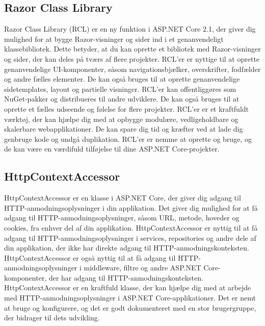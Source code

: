 \subsection{Razor Class Library}
Razor Class Library (RCL) er en ny funktion i ASP.NET Core 2.1, der giver dig mulighed for at bygge Razor-visninger og sider ind i et genanvendeligt klassebibliotek. Dette betyder, at du kan oprette et bibliotek med Razor-visninger og sider, der kan deles på tværs af flere projekter.
RCL'er er nyttige til at oprette genanvendelige UI-komponenter, såsom navigationsbjælker, overskrifter, fodfælder og andre fælles elementer.
De kan også bruges til at oprette genanvendelige sidetemplates, layout og partielle visninger. RCL'er kan offentliggøres som NuGet-pakker og distribueres til andre udviklere.
De kan også bruges til at oprette et fælles udseende og følelse for flere projekter. RCL'er er et kraftfuldt værktøj, der kan hjælpe dig med at opbygge modulære, vedligeholdbare og skalerbare webapplikationer.
De kan spare dig tid og kræfter ved at lade dig genbruge kode og undgå duplikation. RCL'er er nemme at oprette og bruge, og de kan være en værdifuld tilføjelse til dine ASP.NET Core-projekter.

\subsection{HttpContextAccessor}
HttpContextAccessor er en klasse i ASP.NET Core, der giver dig adgang til HTTP-anmodningsoplysninger i din applikation. Det giver dig mulighed for at få adgang til HTTP-anmodningsoplysninger, såsom URL, metode, hoveder og cookies, fra enhver del af din applikation.
HttpContextAccessor er nyttig til at få adgang til HTTP-anmodningsoplysninger i services, repositories og andre dele af din applikation, der ikke har direkte adgang til HTTP-anmodningskonteksten.
HttpContextAccessor er også nyttig til at få adgang til HTTP-anmodningsoplysninger i middleware, filtre og andre ASP.NET Core-komponenter, der har adgang til HTTP-anmodningskonteksten.
HttpContextAccessor er en kraftfuld klasse, der kan hjælpe dig med at arbejde med HTTP-anmodningsoplysninger i ASP.NET Core-applikationer. Det er nemt at bruge og konfigurere, og det er godt dokumenteret med en stor brugergruppe, der bidrager til dets udvikling.

